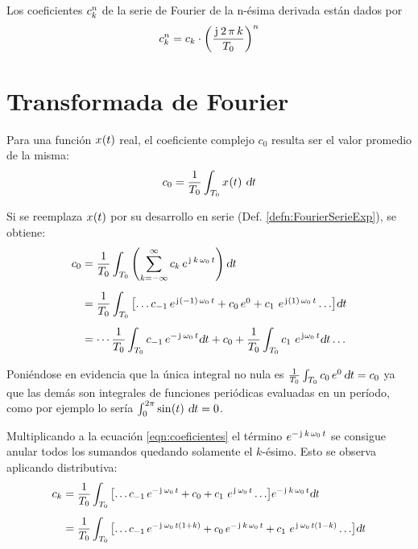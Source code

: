 \begin{mdframed}[style=PropertyFrame]
    \begin{prop}
    \end{prop}
    Los coeficientes $c_\kth^\nth$ de la serie de Fourier de la n-ésima derivada están dados por
    \begin{equation*}
        c_\kth^\nth = c_\kth \cdot \inParentheses{\frac{\iu \, 2 \, \pi \, \kth}{T_0}}^\nth
    \end{equation*}
\end{mdframed}


\section{Transformada de Fourier}

Para una función $\fx[x]{t}$ real, el coeficiente complejo $c_0$ resulta ser el valor promedio de la misma:
\begin{equation*}
    c_0 = \frac{1}{T_0} \int_{T_0} \fx[x]{t} \, \dif t
\end{equation*}

Si se reemplaza $\fx[x]{t}$ por su desarrollo en serie (Def. \ref{defn:FourierSerieExp}), se obtiene:
\begin{align}
    c_0 &= \frac{1}{T_0} \int_{T_0} \inParentheses{\sum_{\kth=-\infty}^\infty c_\kth \, e^{\iu \, \kth \, \omega_0 \, t}} \dif t
    \notag
    \\[1ex]
    &= \frac{1}{T_0} \int_{T_0} \inBrackets{\dots c_{-1} \, e^{\iu \inParentheses{-1} \, \omega_0 \, t} + c_0 \, e^0 + c_1 \, \, e^{\iu \inParentheses{1} \, \omega_0 \, t} \dots} \dif t
    \label{eqn:coeficientes}
    \\[1ex]
    &= \cdots \frac{1}{T_0} \int_{T_0} c_{-1} \, e^{- \iu \, \omega_0 \, t} \dif t
    + c_0
    + \frac{1}{T_0} \int_{T_0} c_1 \, \, e^{\iu \omega_0 \, t} \dif t \dots
    \notag
\end{align}

Poniéndose en evidencia que la única integral no nula es $\frac{1}{T_0} \int_{T_0} c_0 \, e^0 \, \dif t = c_0$ ya que las demás son integrales de funciones periódicas evaluadas en un período, como por ejemplo lo sería $\int_0^{2\pi} \fx[\sin]{t} \, \dif t = 0$.

Multiplicando a la ecuación \ref{eqn:coeficientes} el término $e^{-\iu \, \kth \, \omega_0 \, t}$ se consigue anular todos los sumandos quedando solamente el $k$-ésimo.
Esto se observa aplicando distributiva:
\begin{align*}
    c_\kth &=
    \scale{0.95}{
    \frac{1}{T_0} \int_{T_0} \inBrackets{\dots c_{-1} \, e^{-\iu \, \omega_0 \, t} + c_0 + c_1 \, \, e^{\iu \, \omega_0 \, t} \dots} e^{-\iu \, \kth \, \omega_0 \, t} \dif t
    }
    \\[1ex]
    &= 
    \scale{0.95}{
    \frac{1}{T_0} \int_{T_0} \inBrackets{\dots c_{-1} \, e^{-\iu \, \omega_0 \, t \inParentheses{1 + k}} + c_0 \, e^{-\iu \, \kth \, \omega_0 \, t} + c_1 \, \, e^{\iu \, \omega_0 \, t \inParentheses{1 - k}} \dots} \dif t
    }
\end{align*}


